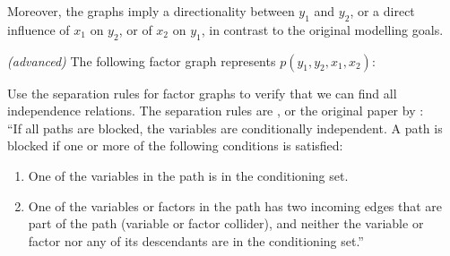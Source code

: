 \begin{exenumerate}
\begin{solution}
    Moreover, the graphs imply a directionality between $y_1$ and
    $y_2$, or a direct influence of $x_1$ on $y_2$, or of $x_2$ on
    $y_1$, in contrast to the original modelling goals.
    
   \end{solution}


 \item \emph{(advanced)} The following factor graph represents $p(y_1,y_2,x_1,x_2)$:
\begin{center}
    \end{center}

Use the separation rules for factor graphs to verify that we can find all independence relations. The separation rules are \citep[see][Section 4.4.1]{Barber2012}, or the original paper by \citet{Frey2003}:\\[1ex]
``If all paths are blocked, the variables are conditionally independent. A path is blocked if one or more of the following conditions is satisfied:
\begin{enumerate}
\item One of the variables in the path is in the conditioning set.
\item One of the variables or factors in the path has two incoming edges that are part of the path (variable or factor collider), and neither the variable or factor nor any of its descendants are in the conditioning set.''
\end{enumerate}


\end{exenumerate}
